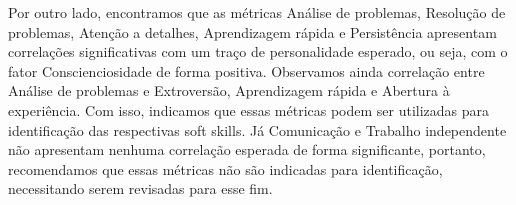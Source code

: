 Por outro lado, encontramos que as métricas Análise de problemas, Resolução de problemas, Atenção a detalhes, Aprendizagem rápida e Persistência apresentam correlações significativas com um traço de personalidade esperado, ou seja, com o fator Conscienciosidade de forma positiva. Observamos ainda correlação entre Análise de problemas e Extroversão, Aprendizagem rápida e Abertura à experiência.
Com isso, indicamos que essas métricas podem ser utilizadas para identificação das respectivas soft skills.
Já Comunicação e Trabalho independente não apresentam nenhuma correlação esperada de forma significante, portanto, recomendamos que essas métricas não são indicadas para identificação, necessitando serem revisadas para esse fim.


